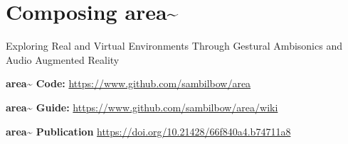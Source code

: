 \chapter{Composing area\textasciitilde{}}{Exploring Real and Virtual Environments Through Gestural Ambisonics and Audio Augmented Reality}
\label{sec: area}
\epigraph{\emph{}}{}

\noindent \textbf{area\textasciitilde{} Code:}        \url{https://www.github.com/sambilbow/area}

\noindent \textbf{area\textasciitilde{} Guide:}       \url{https://www.github.com/sambilbow/area/wiki}

\noindent \textbf{area\textasciitilde{} Publication } \url{https://doi.org/10.21428/66f840a4.b74711a8}

\clearpage



